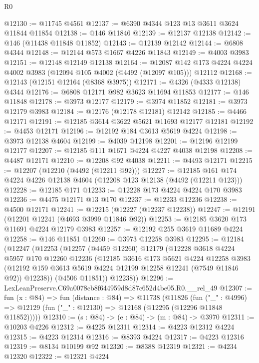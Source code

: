 \begin{lexlean}{R0}
\begin{coremodule}
@12130 := @11745 @4561
@12137 := @6390 @4344 @123 @13 @3611 @3624 @11844 @11854
@12138 := @146 @11846
@12139 := @12137 @12138
@12142 := @146 (@11438 @11848 @11852)
@12143 := @12139 @12142
@12144 := @6808 @4344
@12148 := @12144 @573 @1667 @4226 @11843
@12149 := @4003 @3983
@12151 := @12148 @12149 @12138
@12164 := @12087 @142 @173 @4224 @4224 @4002 @3983 (@12094 @105 @4002 (@4492 (@12097 @105))) @12112
@12168 := @12143 (@12151 @12164 (@8368 @3975))
@12171 := @4326 (@4333 @12138) @4344
@12176 := @6808 @12171 @982 @3623 @11694 @11853
@12177 := @146 @11848
@12178 := @3973 @12177
@12179 := @3974 @11852
@12181 := @3973 @12179 @3983
@12184 := @12176 (@12178 @12181) @12142
@12185 := @4466 @12171
@12191 := @12185 @3614 @3622 @5621 @11693 @12177 @12181
@12192 := @4453 @12171
@12196 := @12192 @184 @3613 @5619 @4224
@12198 := @3973 @12138 @4604
@12199 := @4039 @12198
@12201 := @12196 @12199 @12177
@12207 := @12185 @111 @1671 @4224 @4227 @4038 @12198
@12208 := @4487 @12171
@12210 := @12208 @92 @4038
@12211 := @4493 @12171
@12215 := @12207 (@12210 (@4492 (@12211 @92)))
@12227 := @12185 @161 @174 @4224 @4226 @12138 @4604 (@12208 @123 @12138 (@4492 (@12211 @123)))
@12228 := @12185 @171
@12233 := @12228 @173 @4224 @4224 @170 @3983
@12236 := @4475 @12171 @13 @170
@12237 := @12233 @12236
@12238 := @4500 @12171
@12241 := @12215 (@12227 (@12237 @12238))
@12247 := @12191 (@12201 @12241 (@4693 @3999 @11846 @92))
@12253 := @12185 @3620 @173 @11691 @4224 @12179 @3983
@12257 := @12192 @255 @3619 @11689 @4224
@12258 := @146 @11851
@12260 := @3973 @12258 @3983
@12295 := @12184
    (@12247
      (@12253
        (@12257
          (@4459 @12260)
          @12179
          (@12228
            @3618
            @4224
            @5957
            @170
            @12260
            @12236
            (@12185
              @3616
              @173
              @5621
              @4224
              @12258
              @3983
              (@12192 @159 @3613 @5619 @4224 @12199 @12258 @12241 (@7549 @11846 @92))
              @12238))
          (@4506 @11851))
        @12238))
@12296 := LexLeanPreserve.C69a0078cb8f644959d8d87c652d4be05.R0.__rel_49
@12307 := fun (x : @84) =>
  fun (distance : @84) =>
  @11738
    (@11826
      (fun ("_" : @4996) => @12129 (fun ("_" : @12130) => @12168 (@12295 (@12296 @11848 @11852)))))
@12310 := (s : @84) -> (e : @84) -> (m : @84) -> @3970
@12311 := @10203 @4226
@12312 := @4225 @12311
@12314 := @4223 @12312 @4224
@12315 := @4223 @12314
@12316 := @8393 @4224
@12317 := @4223 @12316
@12319 := @8134 @10199 @92
@12320 := @8388 @12319
@12321 := @4234 @12320
@12322 := @12321 @4224

\end{coremodule}
\end{lexlean}
